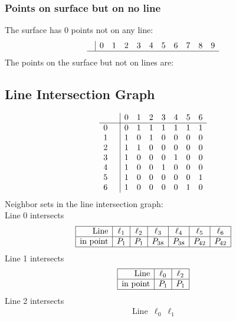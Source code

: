 \documentclass{article}
\begin{document}
{\subsubsection*{Points on surface but on no line}
The surface has 0 points not on any line:\\
$$
\begin{array}{r|*{10}{r}}
 & 0 & 1 & 2 & 3 & 4 & 5 & 6 & 7 & 8 & 9\\
\hline
\end{array}
$$
The points on the surface but not on lines are:\\
\begin{multicols}{2}
\noindent
\end{multicols}
\subsection*{Line Intersection Graph}
{\arraycolsep=1pt
$$
\begin{array}{rr|*{7}r}
 &  & 0 & 1 & 2 & 3 & 4 & 5 & 6\\
\hline
0 &  & 0 & 1 & 1 & 1 & 1 & 1 & 1\\
1 &  & 1 & 0 & 1 & 0 & 0 & 0 & 0\\
2 &  & 1 & 1 & 0 & 0 & 0 & 0 & 0\\
3 &  & 1 & 0 & 0 & 0 & 1 & 0 & 0\\
4 &  & 1 & 0 & 0 & 1 & 0 & 0 & 0\\
5 &  & 1 & 0 & 0 & 0 & 0 & 0 & 1\\
6 &  & 1 & 0 & 0 & 0 & 0 & 1 & 0\\
\end{array}
$$
}%
Neighbor sets in the line intersection graph:\\
Line 0 intersects 
$$
\begin{array}{|r*{6}{|c}|}
\hline
\mbox{Line}  & \ell_{1} & \ell_{2} & \ell_{3} & \ell_{4} & \ell_{5} & \ell_{6}\\
\hline
\mbox{in point}  & P_{1} & P_{1} & P_{38} & P_{38} & P_{42} & P_{42}\\
\hline
\end{array}
$$
Line 1 intersects 
$$
\begin{array}{|r*{2}{|c}|}
\hline
\mbox{Line}  & \ell_{0} & \ell_{2}\\
\hline
\mbox{in point}  & P_{1} & P_{1}\\
\hline
\end{array}
$$
Line 2 intersects 
$$
\begin{array}{|r*{2}{|c}|}
\hline
\mbox{Line}  & \ell_{0} & \ell_{1}\\

\end{array}$$}
\end{document}
